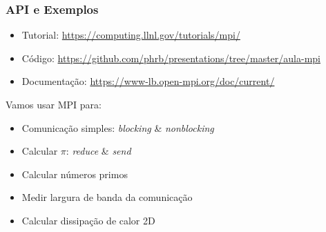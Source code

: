 \documentclass[12pt, compress, aspectratio=169, xcolor={table,usenames,dvipsnames}]{beamer}
\begin{document}
\begin{frame}
    \frametitle{API e Exemplos}
    \begin{itemize}
        \item \alert{Tutorial}: \url{https://computing.llnl.gov/tutorials/mpi/}
        \item \alert{Código}: \url{https://github.com/phrb/presentations/tree/master/aula-mpi}
        \item \alert{Documentação}: \url{https://www-lb.open-mpi.org/doc/current/}
    \end{itemize}

    Vamos usar MPI para:

    \begin{itemize}
        \item Comunicação simples: \textit{blocking} \& \textit{nonblocking}
        \item Calcular $\pi$: \textit{reduce} \& \textit{send}
        \item Calcular números primos
        \item Medir largura de banda da comunicação
        \item Calcular dissipação de calor 2D
    \end{itemize}
\end{frame}

\end{document}
